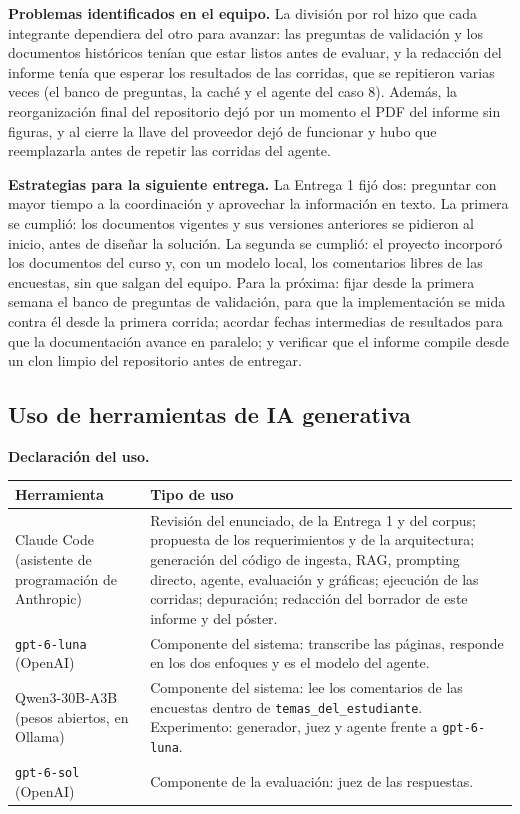 \documentclass[11pt,letterpaper]{article}
\newcommand{\cod}[1]{\texttt{\small #1}}
\begin{document}
\textbf{Problemas identificados en el equipo.} La división por rol hizo que cada integrante dependiera del otro para avanzar: las preguntas de validación y los documentos históricos tenían que estar listos antes de evaluar, y la redacción del informe tenía que esperar los resultados de las corridas, que se repitieron varias veces (el banco de preguntas, la caché y el agente del caso 8). Además, la reorganización final del repositorio dejó por un momento el PDF del informe sin figuras, y al cierre la llave del proveedor dejó de funcionar y hubo que reemplazarla antes de repetir las corridas del agente.

\textbf{Estrategias para la siguiente entrega.} La Entrega 1 fijó dos: preguntar con mayor tiempo a la coordinación y aprovechar la información en texto. La primera se cumplió: los documentos vigentes y sus versiones anteriores se pidieron al inicio, antes de diseñar la solución. La segunda se cumplió: el proyecto incorporó los documentos del curso y, con un modelo local, los comentarios libres de las encuestas, sin que salgan del equipo. Para la próxima: fijar desde la primera semana el banco de preguntas de validación, para que la implementación se mida contra él desde la primera corrida; acordar fechas intermedias de resultados para que la documentación avance en paralelo; y verificar que el informe compile desde un clon limpio del repositorio antes de entregar.

\subsection{Uso de herramientas de IA generativa}

\textbf{Declaración del uso.}

\begin{table}[H]\small\renewcommand{\arraystretch}{1.15}
\begin{tabularx}{\textwidth}{>{\raggedright\arraybackslash}p{}L}
\toprule
\textbf{Herramienta} & \textbf{Tipo de uso} \\
\midrule
Claude Code (asistente de programación de Anthropic) & Revisión del enunciado, de la Entrega 1 y del corpus; propuesta de los requerimientos y de la arquitectura; generación del código de ingesta, RAG, prompting directo, agente, evaluación y gráficas; ejecución de las corridas; depuración; redacción del borrador de este informe y del póster. \\
\cod{gpt-6-luna} (OpenAI) & Componente del sistema: transcribe las páginas, responde en los dos enfoques y es el modelo del agente. \\
Qwen3-30B-A3B (pesos abiertos, en Ollama) & Componente del sistema: lee los comentarios de las encuestas dentro de \cod{temas\_del\_estudiante}. Experimento: generador, juez y agente frente a \cod{gpt-6-luna}. \\
\cod{gpt-6-sol} (OpenAI) & Componente de la evaluación: juez de las respuestas. \\
\bottomrule
\end{tabularx}
\end{table}
\end{document}
